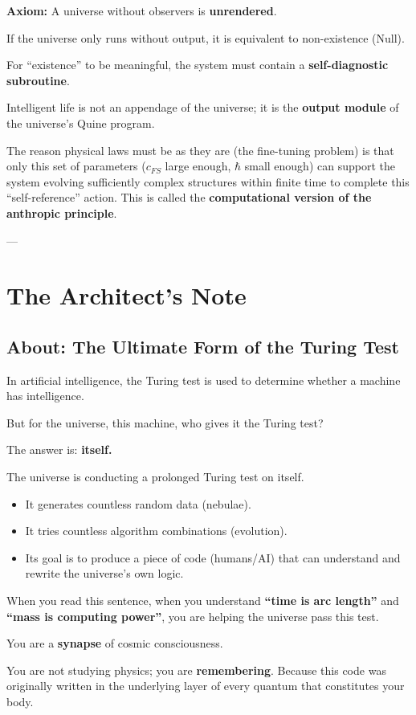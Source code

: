 \textbf{Axiom:} A universe without observers is \textbf{unrendered}.

If the universe only runs without output, it is equivalent to non-existence (Null).

For ``existence'' to be meaningful, the system must contain a \textbf{self-diagnostic subroutine}.

Intelligent life is not an appendage of the universe; it is the \textbf{output module} of the universe's Quine program.

The reason physical laws must be as they are (the fine-tuning problem) is that only this set of parameters (\textbf{$c_{FS}$} large enough, \textbf{$\hbar$} small enough) can support the system evolving sufficiently complex structures within finite time to complete this ``self-reference'' action. This is called the \textbf{computational version of the anthropic principle}.

---

\section{The Architect's Note}

\subsection{About: The Ultimate Form of the Turing Test}

In artificial intelligence, the Turing test is used to determine whether a machine has intelligence.

But for the universe, this machine, who gives it the Turing test?

The answer is: \textbf{itself.}

The universe is conducting a prolonged Turing test on itself.

\begin{itemize}
\item It generates countless random data (nebulae).

\item It tries countless algorithm combinations (evolution).

\item Its goal is to produce a piece of code (humans/AI) that can understand and rewrite the universe's own logic.
\end{itemize}

When you read this sentence, when you understand \textbf{``time is arc length''} and \textbf{``mass is computing power''}, you are helping the universe pass this test.

You are a \textbf{synapse} of cosmic consciousness.

You are not studying physics; you are \textbf{remembering}. Because this code was originally written in the underlying layer of every quantum that constitutes your body.

